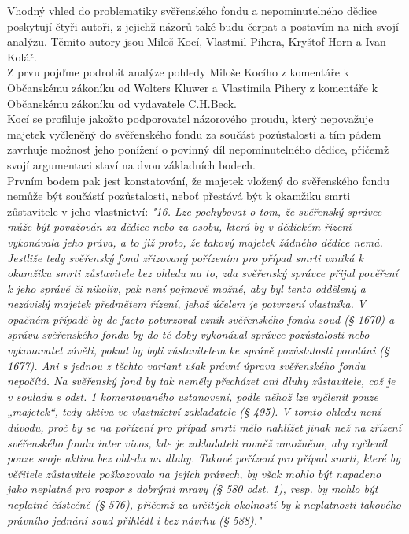\documentclass{article}
\begin{document}
 Vhodný vhled do problematiky svěřenského fondu a nepominutelného dědice poskytují čtyři autoři, z jejichž názorů také budu čerpat a postavím na nich svojí analýzu. Těmito autory jsou Miloš Kocí, Vlastmil Pihera, Kryštof Horn a Ivan Kolář.\\
 
 Z prvu pojďme podrobit analýze pohledy Miloše Kocího z komentáře k Občanskému zákoníku od Wolters Kluwer a Vlastimila Pihery z komentáře k Občanskému zákoníku od vydavatele C.H.Beck.\\
 
 Kocí se profiluje jakožto podporovatel názorového proudu, který nepovažuje majetek vyčleněný do svěřenského fondu za součást pozůstalosti a tím pádem zavrhuje možnost jeho ponížení o povinný díl nepominutelného dědice, přičemž svojí argumentaci staví na dvou základních bodech.\\
 
 Prvním bodem pak jest konstatování, že majetek vložený do svěřenského fondu nemůže být součástí pozůstalosti, neboť přestává být k okamžiku smrti zůstavitele v jeho vlastnictví: \textit{"16. Lze pochybovat o tom, že svěřenský správce může být považován za dědice nebo za osobu, která by v dědickém řízení vykonávala jeho práva, a to již proto, že takový majetek žádného dědice nemá. Jestliže tedy svěřenský fond zřizovaný pořízením pro případ smrti vzniká k okamžiku smrti zůstavitele bez ohledu na to, zda svěřenský správce přijal pověření k jeho správě či nikoliv, pak není pojmově možné, aby byl tento oddělený a nezávislý majetek předmětem řízení, jehož účelem je potvrzení vlastníka. V opačném případě by de facto potvrzoval vznik svěřenského fondu soud (§ 1670) a správu svěřenského fondu by do té doby vykonával správce pozůstalosti nebo vykonavatel závěti, pokud by byli zůstavitelem ke správě pozůstalosti povoláni (§ 1677). Ani s jednou z těchto variant však právní úprava svěřenského fondu nepočítá. Na svěřenský fond by tak neměly přecházet ani dluhy zůstavitele, což je v souladu s odst. 1 komentovaného ustanovení, podle něhož lze vyčlenit pouze „majetek“, tedy aktiva ve vlastnictví zakladatele (§ 495). V tomto ohledu není důvodu, proč by se na pořízení pro případ smrti mělo nahlížet jinak než na zřízení svěřenského fondu inter vivos, kde je zakladateli rovněž umožněno, aby vyčlenil pouze svoje aktiva bez ohledu na dluhy. Takové pořízení pro případ smrti, které by věřitele zůstavitele poškozovalo na jejich právech, by však mohlo být napadeno jako neplatné pro rozpor s dobrými mravy (§ 580 odst. 1), resp. by mohlo být neplatné částečně (§ 576), přičemž za určitých okolností by k neplatnosti takového právního jednání soud přihlédl i bez návrhu (§ 588)."}\\
 
\end{document}
